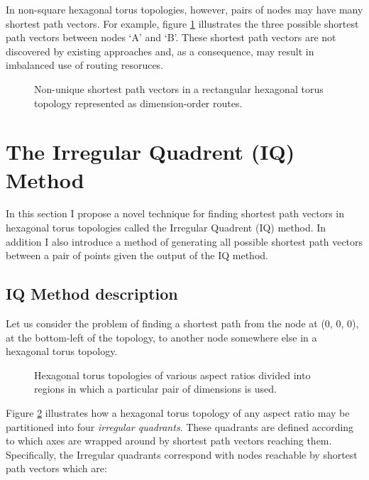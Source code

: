 			In non-square hexagonal torus topologies, however, pairs of nodes may
			have many shortest path vectors. For example, figure \ref{fig:spiralling}
			illustrates the three possible shortest path vectors between nodes `A'
			and `B'. These shortest path vectors are not discovered by existing
			approaches and, as a consequence, may result in imbalanced use of routing
			resoruces.
			
			\begin{figure}
				\center
				
				\caption{Non-unique shortest path vectors in a rectangular hexagonal
				torus topology represented as dimension-order routes.}
				\label{fig:spiralling}
			\end{figure}
		
	\section{The Irregular Quadrent (IQ) Method}
		
		In this section I propose a novel technique for finding shortest path
		vectors in hexagonal torus topologies called the Irregular Quadrent (IQ)
		method. In addition I also introduce a method of generating all possible
		shortest path vectors between a pair of points given the output of the IQ
		method.
		
		\subsection{IQ Method description}
			
			Let us consider the problem of finding a shortest path from the node at
			(0, 0, 0), at the bottom-left of the topology, to another node somewhere
			else in a hexagonal torus topology.
			
			\begin{figure}
				\center
				
				\caption{Hexagonal torus topologies of various aspect ratios divided
				into regions in which a particular pair of dimensions is used.}
				\label{fig:shortest-path-regions}
			\end{figure}
			
			Figure \ref{fig:shortest-path-regions} illustrates how a hexagonal torus
			topology of any aspect ratio may be partitioned into four \emph{irregular
			quadrants}. These quadrants are defined according to which axes are
			wrapped around by shortest path vectors reaching them. Specifically, the
			Irregular quadrants correspond with nodes reachable by shortest path
			vectors which are:
			
